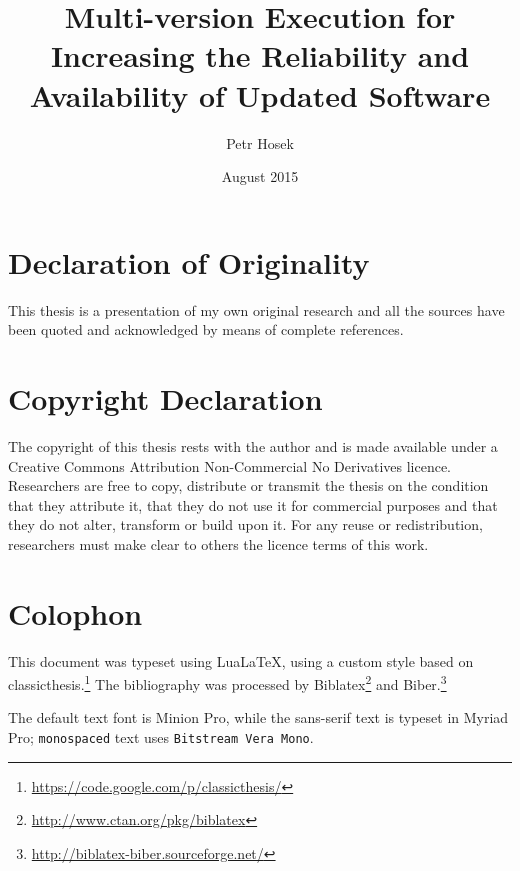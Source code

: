 \documentclass[a4paper,12pt,oneside,minionpro,dottedtoc]{thesis}
\title{Multi-version Execution for Increasing the Reliability and Availability of Updated Software}
\author{Petr Hosek}
\date{August 2015}
\begin{document}
\let\question\savedquestion

\maketitle

\cleardoublepage
\thispagestyle{plain}

\section*{Declaration of Originality}
This thesis is a presentation of my own original research and all the sources
have been quoted and acknowledged by means of complete references.

\section*{Copyright Declaration}
The copyright of this thesis rests with the author and is made available under a Creative Commons
Attribution Non-Commercial No Derivatives licence. Researchers are free to copy, distribute or
transmit the thesis on the condition that they attribute it, that they do not use it for commercial
purposes and that they do not alter, transform or build upon it. For any reuse or redistribution,
researchers must make clear to others the licence terms of this work.

\vfill
\section*{Colophon}

This document was typeset using Lua\LaTeX, using a custom style based on
\textsf{classicthesis}.\footnote{\url{https://code.google.com/p/classicthesis/}}
The bibliography was processed by
Biblatex\footnote{\url{http://www.ctan.org/pkg/biblatex}} and
Biber.\footnote{\url{http://biblatex-biber.sourceforge.net/}}

The default text font is Minion Pro, while the \textsf{sans-serif} text is
typeset in \textsf{Myriad Pro}; \texttt{monospaced} text uses \texttt{Bitstream
Vera Mono}.
\end{document}
